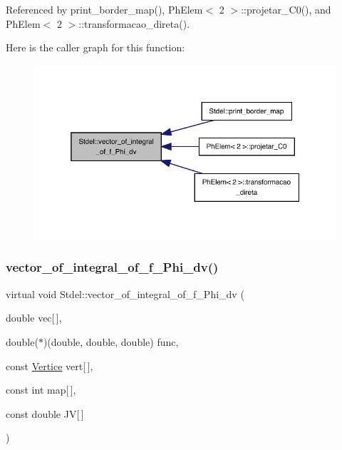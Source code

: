 Referenced by print\+\_\+border\+\_\+map(), Ph\+Elem$<$ 2 $>$\+::projetar\+\_\+\+C0(), and Ph\+Elem$<$ 2 $>$\+::transformacao\+\_\+direta().

Here is the caller graph for this function\+:
\nopagebreak
\begin{figure}[H]
\begin{center}
\leavevmode
\includegraphics[width=325pt]{classStdel_aa5ef347c02106753c2d3961b59a7309e_icgraph}
\end{center}
\end{figure}
\mbox{\label{classStdel_a3a22725f255ab04520ce1744eef8e2c0}} 
\subsubsection{\texorpdfstring{vector\+\_\+of\+\_\+integral\+\_\+of\+\_\+f\+\_\+\+Phi\+\_\+dv()}{vector\_of\_integral\_of\_f\_Phi\_dv()}\hspace{0.1cm}{\footnotesize\ttfamily [2/2]}}
{\footnotesize\ttfamily virtual void Stdel\+::vector\+\_\+of\+\_\+integral\+\_\+of\+\_\+f\+\_\+\+Phi\+\_\+dv (\begin{DoxyParamCaption}\item[{double}]{vec\mbox{[}$\,$\mbox{]},  }\item[{double($\ast$)(double, double, double)}]{func,  }\item[{const \hyperlink{structVertice}{Vertice}}]{vert\mbox{[}$\,$\mbox{]},  }\item[{const int}]{map\mbox{[}$\,$\mbox{]},  }\item[{const double}]{JV\mbox{[}$\,$\mbox{]} }\end{DoxyParamCaption})\hspace{0.3cm}{\ttfamily [pure virtual]}}



